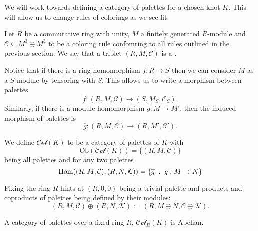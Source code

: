 We will work towards defining a category of palettes for a chosen knot $K$. This will allow us to change rules of colorings as we see fit.

\begin{definition}[palette]
  Let $R$ be a commutative ring with unity, $M$ a finitely generated $R$-module and $\mathcal{C}\subseteq M^3\oplus M^3$ to be a coloring rule confomring to all rules outlined in the previous section. We say that a triplet $(R, M, \mathcal{C})$ is a .
\end{definition}

Notice that if there is a ring homomorphism $f:R\to S$ then we can consider $M$ as a $S$ module by tensoring with $S$. This allows us to write a morphism between palettes
$$\overline{f}:(R, M, \mathcal{C})\to (S, M_S, \mathcal{C}_S).$$
Similarly, if there is a module homomorphism $g:M\to M'$, then the induced morphism of palettes is
$$\overline{g}:(R, M, \mathcal{C})\to (R, M', \mathcal{C}').$$

\begin{definition}
  We define $\mathcal{Col}(K)$ to be a category of palettes of $K$ with 
  $$\text{Ob}(\mathcal{Col}(K))=\{(R, M, \mathcal{C})\}$$
  being all palettes and for any two palettes
  $$\operatorname{Hom}((R, M, \mathcal{C}), (R, N, \mathcal{K}))=\{\overline{g}\;:\;g:M\to N\}$$
\end{definition}

Fixing the ring $R$ hints at $(R, 0, 0)$ being a trivial palette and products and coproducts of palettes being defined by their modules:
$$(R, M, \mathcal{C})\oplus (R, N, \mathcal{K}):=(R, M\oplus N, \mathcal{C}\oplus \mathcal{K}).$$

\begin{conjecture}
  A category of palettes over a fixed ring $R$, $\mathcal{Col}_R(K)$ is Abelian.
\end{conjecture}



